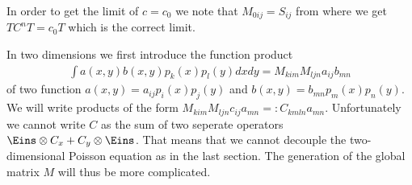 \documentclass[a4paper,12pt]{scrartcl}
\begin{document}
In order to get the limit of $c = c_0$ we note that $M_{0ij} = S_{ij}$ from where
we get $TC^nT = c_0T$ which is the correct limit.


In two dimensions we first introduce the function product 
\begin{align}
    \int a(x,y)b(x,y) p_k(x)p_l(y) dxdy = M_{kim}M_{ljn}a_{ij}b_{mn}
    \label{}
\end{align}
of two function $a(x,y) = a_{ij}p_i(x)p_j(y)$ and $b(x,y) = b_{mn}p_m(x)p_n(y)$.
We will write products of the form $M_{kim}M_{ljn}c_{ij}a_{mn} =: C_{kmln}a_{mn}$. 
Unfortunately we cannot write $C$ as the sum of two seperate operators
$\Eins\otimes C_x + C_y\otimes \Eins$. That means that we cannot decouple the
two-dimensional Poisson equation as in the last section. 
The generation of the global matrix $M$ will
thus be more complicated.
\end{document}
